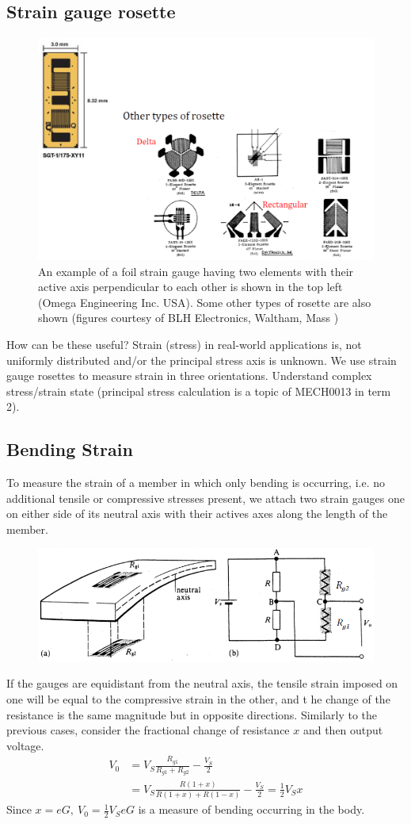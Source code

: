 \documentclass[class=report, crop=false, 12pt,a4paper, tikz, border=4mm]{standalone}
\begin{document}
\subsection{Strain gauge rosette}
\begin{figure}[H]
  \centering
  \includegraphics[width = 0.8 \textwidth]{../img/diagram15.png}
  \caption{An example of a foil strain gauge having two elements with their active axis perpendicular to each other is shown in the top left (Omega Engineering Inc. USA). Some other types of rosette are also shown (figures courtesy of BLH Electronics, Waltham, Mass )}
\end{figure}
How can be these useful? Strain (stress) in real-world applications is, not uniformly distributed and/or the principal stress axis is unknown. We use strain gauge rosettes to measure strain in three orientations. Understand complex stress/strain state (principal stress calculation is a topic of MECH0013 in term 2).
\subsection{Bending Strain}
To measure the strain of a member in which only bending is occurring, i.e. no additional tensile or compressive stresses present, we attach two strain gauges one on either side of its neutral axis with their actives axes along the length of the member.
\begin{figure}[H]
  \centering
  \includegraphics[width = 0.8 \textwidth]{../img/diagram16.png}
\end{figure}
If the gauges are equidistant from the neutral axis, the tensile strain imposed on one will be equal to the compressive strain in the other, and t he change of the resistance is the same magnitude but in opposite directions. Similarly to the previous cases, consider the fractional change of resistance $x$ and then output voltage.
\begin{align}
  V_0 &= V_S \frac{R_{g1}}{R_{g1} + R_{g2}} - \frac{V_S}{2}\\
  &= V_S \frac{R(1+x)}{R(1+x) + R(1-x)} - \frac{V_S}{2} = \frac{1}{2} V_S x
\end{align}
Since $x=eG, \ V_0 = \frac{1}{2} V_S eG$ is a measure of bending occurring in the body.
\end{document}
